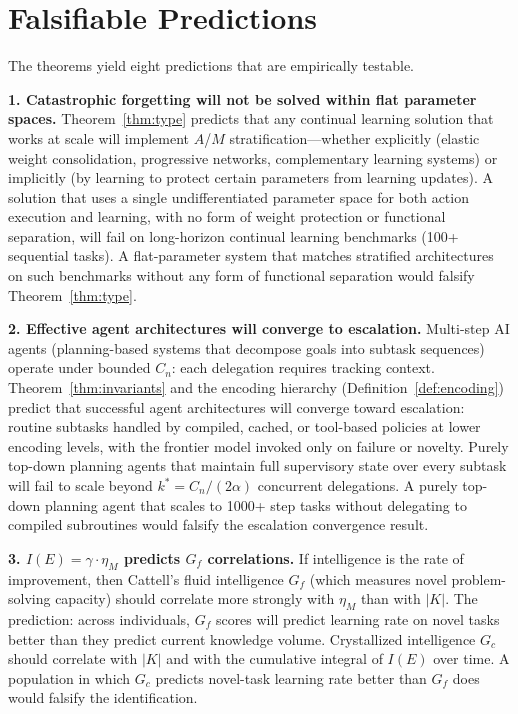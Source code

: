 \documentclass[11pt]{article}
\theoremstyle{definition}
\theoremstyle{remark}
\begin{document}
\section{Falsifiable Predictions}
\label{sec:predictions}

The theorems yield eight predictions that are empirically testable.

\textbf{1. Catastrophic forgetting will not be solved within flat
parameter spaces.}
Theorem~\ref{thm:type} predicts that any continual learning solution
that works at scale will implement $A$/$M$ stratification---whether
explicitly (elastic weight consolidation, progressive networks,
complementary learning systems) or implicitly (by learning to protect
certain parameters from learning updates). A solution that uses a
single undifferentiated parameter space for both action execution and
learning, with no form of weight protection or functional separation,
will fail on long-horizon continual learning benchmarks (100+
sequential tasks). A flat-parameter system that matches stratified
architectures on such benchmarks without any form of functional
separation would falsify Theorem~\ref{thm:type}.

\textbf{2. Effective agent architectures will converge to escalation.}
Multi-step AI agents (planning-based systems that decompose goals into
subtask sequences) operate under bounded $C_n$: each delegation
requires tracking context. Theorem~\ref{thm:invariants} and the
encoding hierarchy (Definition~\ref{def:encoding}) predict that
successful agent architectures will converge toward escalation:
routine subtasks handled by compiled, cached, or tool-based policies
at lower encoding levels, with the frontier model invoked only on
failure or novelty. Purely top-down planning agents that maintain
full supervisory state over every subtask will fail to scale beyond
$k^* = C_n / (2\alpha)$ concurrent delegations. A purely top-down
planning agent that scales to 1000+ step tasks without delegating to
compiled subroutines would falsify the escalation convergence result.

\textbf{3. $I(E) = \gamma \cdot \eta_M$ predicts $G_f$ correlations.}
If intelligence is the rate of improvement, then Cattell's fluid
intelligence $G_f$ (which measures novel problem-solving capacity)
should correlate more strongly with $\eta_M$ than with $|K|$. The
prediction: across individuals, $G_f$ scores will predict learning
rate on novel tasks better than they predict current knowledge
volume. Crystallized intelligence $G_c$ should correlate with
$|K|$ and with the cumulative integral of $I(E)$ over time. A
population in which $G_c$ predicts novel-task learning rate better
than $G_f$ does would falsify the identification.
\end{document}
